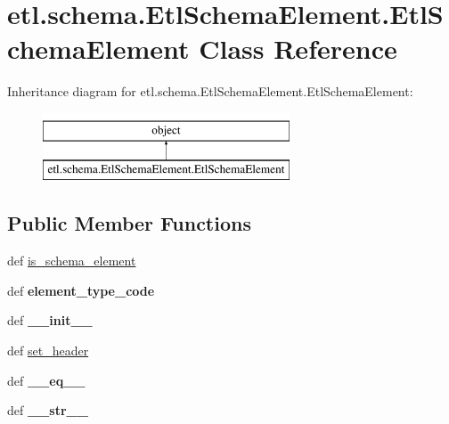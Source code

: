 \hypertarget{classetl_1_1schema_1_1EtlSchemaElement_1_1EtlSchemaElement}{\section{etl.\-schema.\-Etl\-Schema\-Element.\-Etl\-Schema\-Element Class Reference}
\label{classetl_1_1schema_1_1EtlSchemaElement_1_1EtlSchemaElement}
}
Inheritance diagram for etl.\-schema.\-Etl\-Schema\-Element.\-Etl\-Schema\-Element\-:\begin{figure}[H]
\begin{center}
\leavevmode
\includegraphics[height=2.000000cm]{classetl_1_1schema_1_1EtlSchemaElement_1_1EtlSchemaElement}
\end{center}
\end{figure}
\subsection*{Public Member Functions}
\begin{DoxyCompactItemize}
\item 
def \hyperlink{classetl_1_1schema_1_1EtlSchemaElement_1_1EtlSchemaElement_acbcff59a143bee00955e171565dcf872}{is\-\_\-schema\-\_\-element}
\item 
\hypertarget{classetl_1_1schema_1_1EtlSchemaElement_1_1EtlSchemaElement_a7ef81618ee68fb1cbf350ca9c9937215}{def {\bfseries element\-\_\-type\-\_\-code}}\label{classetl_1_1schema_1_1EtlSchemaElement_1_1EtlSchemaElement_a7ef81618ee68fb1cbf350ca9c9937215}

\item 
\hypertarget{classetl_1_1schema_1_1EtlSchemaElement_1_1EtlSchemaElement_a153d4c047df7b5b065f771a2116974fd}{def {\bfseries \-\_\-\-\_\-init\-\_\-\-\_\-}}\label{classetl_1_1schema_1_1EtlSchemaElement_1_1EtlSchemaElement_a153d4c047df7b5b065f771a2116974fd}

\item 
def \hyperlink{classetl_1_1schema_1_1EtlSchemaElement_1_1EtlSchemaElement_adcf1f1373de38cddd494fd604c33a01a}{set\-\_\-header}
\item 
\hypertarget{classetl_1_1schema_1_1EtlSchemaElement_1_1EtlSchemaElement_a352542775633524d4050c9054c7a5ece}{def {\bfseries \-\_\-\-\_\-eq\-\_\-\-\_\-}}\label{classetl_1_1schema_1_1EtlSchemaElement_1_1EtlSchemaElement_a352542775633524d4050c9054c7a5ece}

\item 
\hypertarget{classetl_1_1schema_1_1EtlSchemaElement_1_1EtlSchemaElement_ae59f607e19ac0f96fa53985eeb7ca243}{def {\bfseries \-\_\-\-\_\-str\-\_\-\-\_\-}}\label{classetl_1_1schema_1_1EtlSchemaElement_1_1EtlSchemaElement_ae59f607e19ac0f96fa53985eeb7ca243}

\end{DoxyCompactItemize}
